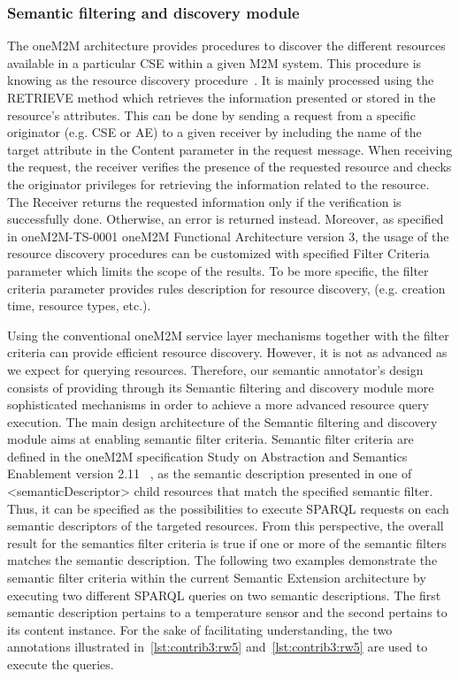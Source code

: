 \subsubsection{Semantic filtering and discovery module}
The oneM2M architecture provides procedures to discover the different resources available in a particular CSE within a given M2M system. This procedure is knowing as the resource discovery procedure~\cite{TS}. It is mainly processed using the RETRIEVE method which retrieves the information presented or stored in the resource’s attributes. This can be done by sending a request from a specific originator (e.g. CSE or AE) to a given receiver by including the name of the target attribute in the Content parameter in the request message. When receiving the request, the receiver verifies the presence of the requested resource and checks the originator privileges for retrieving the information related to the resource. The Receiver returns the requested information only if the verification is successfully done. Otherwise, an error is returned instead. 
Moreover, as specified in oneM2M-TS-0001 oneM2M Functional Architecture version 3, the usage of the resource discovery procedures can be customized with specified Filter Criteria parameter which limits the scope of the results. To be more specific, the filter criteria parameter provides rules description for resource discovery, (e.g. creation time, resource types, etc.).\par
{}
Using the conventional oneM2M service layer mechanisms together with the filter criteria can provide efficient resource discovery. However, it is not as advanced as we expect for querying resources. Therefore, our semantic annotator’s design consists of providing through its Semantic filtering and discovery module more sophisticated mechanisms in order to achieve a more advanced resource query execution. The main design architecture of the Semantic filtering and discovery module aims at enabling semantic filter criteria. Semantic filter criteria are defined in the oneM2M specification Study on Abstraction and Semantics Enablement version 2.11~\cite{211} , as the semantic description presented in one of <semanticDescriptor> child resources that match the specified semantic filter. Thus, it can be specified as the possibilities to execute SPARQL requests on each semantic descriptors of the targeted resources. From this perspective, the overall result for the semantics filter criteria is true if one or more of the semantic filters matches the semantic description. The following two examples demonstrate the semantic filter criteria within the current Semantic Extension architecture by executing two different SPARQL queries on two semantic descriptions. The first semantic description pertains to a temperature sensor and the second pertains to its content instance. For the sake of facilitating understanding, the two annotations illustrated in~\ref{lst:contrib3:rw5} and~\ref{lst:contrib3:rw5} are used to execute the queries.  \par 

